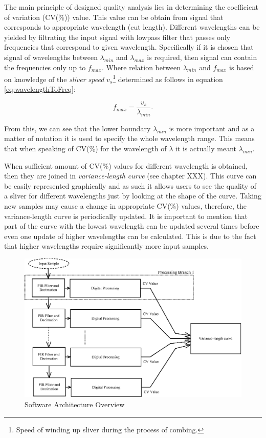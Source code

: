 \documentclass[twoside]{ctuthesis}
\theoremstyle{plain}
\theoremstyle{definition}
\theoremstyle{note}
\begin{document}
The main principle of designed quality analysis lies in determining the coefficient of variation (CV(\%)) value. This value can be obtain from signal that corresponds to appropriate wavelength (cut length). Different wavelengths can be yielded by filtrating the input signal with lowpass filter that passes only frequencies that correspond to given wavelength. Specifically if it is chosen that signal of wavelengths between $\lambda_{min}$ and $\lambda_{max}$ is required, then signal can contain the frequencies only up to $f_{max}$. Where relation between $\lambda_{min}$ and $f_{max}$ is based on knowledge of the \textit{sliver speed} $v_{s}$\footnote{Speed of winding up sliver during the process of combing.} determined as follows in equation \ref{eq:wavelengthToFreq}:

\begin{equation} \label{eq:wavelengthToFreq}
f_{max} = \frac{v_{s}}{\lambda_{min}}.
\end{equation}

From this, we can see that the lower boundary $\lambda_{min}$ is more important and as a matter of notation it is used to specify the whole wavelength range. This means that when speaking of CV(\%) for the wavelength of $\lambda$ it is actually meant $\lambda_{min}$.

When sufficient amount of CV(\%) values for different wavelength is obtained, then they are joined in \textit{variance-length curve} (see chapter XXX). This curve can be easily represented graphically and as such it allows users to see the quality of a sliver for different wavelengths just by looking at the shape of the curve. Taking new samples may cause a change in appropriate CV(\%) values, therefore, the variance-length curve is periodically updated. It is important to mention that part of the curve with the lowest wavelength can be updated several times before even one update of higher wavelengths can be calculated. This is due to the fact that higher wavelengths require significantly more input samples.

\begin{figure}[h]
	\centering
	\includegraphics[width=1.0\textwidth]{system_overview.eps}
	\caption{Software Architecture Overview}
	\label{fig:software_overview}
\end{figure}
\end{document}

